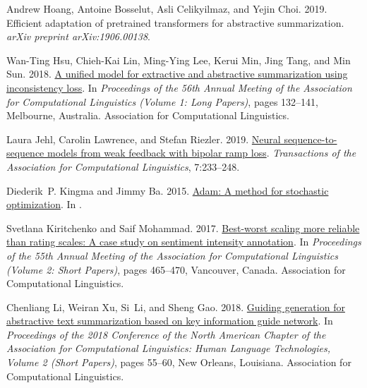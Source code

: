 \documentclass[11pt,a4paper]{article}
\begin{document}
\begin{thebibliography}{46}
Andrew Hoang, Antoine Bosselut, Asli Celikyilmaz, and Yejin Choi. 2019.
\newblock Efficient adaptation of pretrained transformers for abstractive
  summarization.
\newblock \emph{arXiv preprint arXiv:1906.00138}.

Wan-Ting Hsu, Chieh-Kai Lin, Ming-Ying Lee, Kerui Min, Jing Tang, and Min Sun.
  2018.
\newblock \href {https://doi.org/10.18653/v1/P18-1013} {A unified model for
  extractive and abstractive summarization using inconsistency loss}.
\newblock In \emph{Proceedings of the 56th Annual Meeting of the Association
  for Computational Linguistics (Volume 1: Long Papers)}, pages 132--141,
  Melbourne, Australia. Association for Computational Linguistics.

Laura Jehl, Carolin Lawrence, and Stefan Riezler. 2019.
\newblock \href {https://doi.org/10.1162/tacl_a_00265} {Neural
  sequence-to-sequence models from weak feedback with bipolar ramp loss}.
\newblock \emph{Transactions of the Association for Computational Linguistics},
  7:233--248.

Diederik~P. Kingma and Jimmy Ba. 2015.
\newblock \href {http://arxiv.org/abs/1412.6980} {Adam: {A} method for
  stochastic optimization}.
\newblock In  \cite{DBLP:conf/iclr/2015}.

Svetlana Kiritchenko and Saif Mohammad. 2017.
\newblock \href {https://doi.org/10.18653/v1/P17-2074} {Best-worst scaling more
  reliable than rating scales: A case study on sentiment intensity annotation}.
\newblock In \emph{Proceedings of the 55th Annual Meeting of the Association
  for Computational Linguistics (Volume 2: Short Papers)}, pages 465--470,
  Vancouver, Canada. Association for Computational Linguistics.

Chenliang Li, Weiran Xu, Si~Li, and Sheng Gao. 2018.
\newblock \href {https://doi.org/10.18653/v1/N18-2009} {Guiding generation for
  abstractive text summarization based on key information guide network}.
\newblock In \emph{Proceedings of the 2018 Conference of the North {A}merican
  Chapter of the Association for Computational Linguistics: Human Language
  Technologies, Volume 2 (Short Papers)}, pages 55--60, New Orleans, Louisiana.
  Association for Computational Linguistics.


\end{thebibliography}
\end{document}
